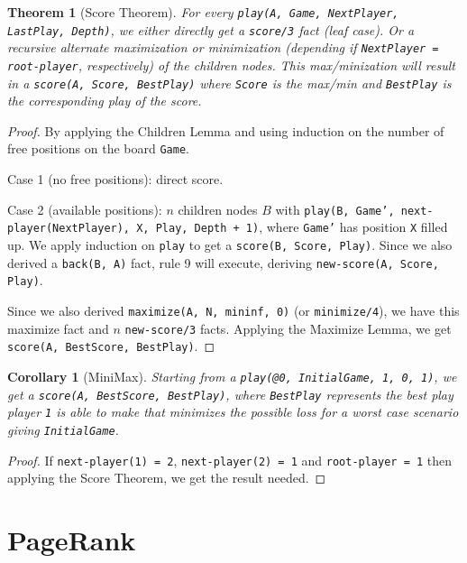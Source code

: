 \documentclass[9pt]{article}
\newtheorem{theorem}{Theorem}
\newtheorem{corollary}{Corollary}
\begin{document}
\begin{theorem}[Score Theorem]
For every \texttt{play(A, Game, NextPlayer, LastPlay, Depth)}, we either
directly get a \texttt{score/3} fact (leaf case). Or a recursive alternate maximization or
minimization (depending if \texttt{NextPlayer = root-player}, respectively) of
the children nodes. This max/minization will result in a \texttt{score(A, Score,
BestPlay)} where \texttt{Score} is the max/min and \texttt{BestPlay} is the
corresponding play of the score.
\end{theorem}
\begin{proof}
By applying the Children Lemma and using induction on the number of free
positions on the board \texttt{Game}.

Case 1 (no free positions): direct score.

Case 2 (available positions): $n$ children nodes $B$ with \texttt{play(B, Game',
      next-player(NextPlayer), X, Play, Depth + 1)}, where \texttt{Game'} has
position \texttt{X} filled up. We apply induction on \texttt{play} to get a
\texttt{score(B, Score, Play)}. Since we also derived a \texttt{back(B, A)}
fact, rule 9 will execute, deriving \texttt{new-score(A, Score, Play)}.

Since we also derived \texttt{maximize(A, N, mininf, 0)} (or
\texttt{minimize/4}), we have this maximize fact and $n$ \texttt{new-score/3}
facts. Applying the Maximize Lemma, we get \texttt{score(A, BestScore,
BestPlay)}.
\end{proof}

\begin{corollary}[MiniMax]
Starting from a \texttt{play(@0, InitialGame, 1, 0, 1)}, we get a
\texttt{score(A, BestScore, BestPlay)}, where \texttt{BestPlay} represents the
best play player \texttt{1} is able to make that minimizes the possible loss for
a worst case scenario giving \texttt{InitialGame}.
\end{corollary}
\begin{proof}
If \texttt{next-player(1) = 2}, \texttt{next-player(2) = 1} and
\texttt{root-player = 1} then applying the Score Theorem, we get the result
needed.
\end{proof}

\section{PageRank}
\end{document}
